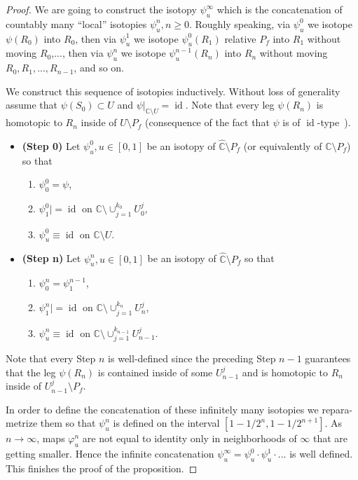 \documentclass[10pt,reqno,a4paper]{amsart}
\numberwithin{figure}{section}
\numberwithin{equation}{section}
\newcommand{\idt}{of $\id$-type}
\newcommand{\id}{\operatorname{id}}
\begin{document}
\begin{proof}
	We are going to construct the isotopy $\psi_u^\infty$ which is the concatenation of countably many ``local'' isotopies $\psi_u^n, n\geq 0$. Roughly speaking, via $\psi_u^0$ we isotope $\psi(R_0)$ into $R_0$, then via $\psi_u^1$ we isotope $\psi_u^0(R_1)$ relative $P_f$ into $R_1$ without moving $R_0$,..., then via $\psi_u^n$ we isotope $\psi_u^{n-1}(R_n)$ into $R_n$ without moving $R_0, R_1,...,R_{n-1}$, and so on. 
	
	We construct this sequence of isotopies inductively. Without loss of generality assume that $\psi(S_0)\subset U$ and $\psi|_{\mathbb{C}\setminus U}=\id$. Note that every leg $\psi(R_n)$ is homotopic to $R_n$ inside of $U\setminus P_f$ (consequence of the fact that $\psi$ is \idt\ ).
	\begin{itemize}
		\item \textbf{(Step 0)} Let $\psi_u^0, u\in[0,1]$ be an isotopy of $\hat{\mathbb{C}}\setminus P_f$ (or equivalently of $\mathbb{C}\setminus P_f$) so that
		\begin{enumerate}
			\item $\psi_0^0=\psi$,
			\item $\psi_1^0|=\id$ on $\mathbb{C}\setminus \cup_{j=1}^{k_0}U_0^j$,
			\item $\psi_u^0\equiv\id$ on $\mathbb{C}\setminus U$.
		\end{enumerate} 
		\item \textbf{(Step n)} Let $\psi_u^n, u\in[0,1]$ be an isotopy of $\hat{\mathbb{C}}\setminus P_f$ so that
		\begin{enumerate}
			\item $\psi_0^n=\psi_1^{n-1}$,
			\item $\psi_1^n|=\id$ on $\mathbb{C}\setminus \cup_{j=1}^{k_n}U_n^j$,
			\item $\psi_u^n\equiv\id$ on $\mathbb{C}\setminus \cup_{j=1}^{k_{n-1}}U_{n-1}^j$.
		\end{enumerate} 
	\end{itemize}	
	Note that every Step $n$ is well-defined since the preceding Step $n-1$ guarantees that the leg $\psi(R_n)$ is contained inside of some $U_{n-1}^j$ and is homotopic to $R_n$ inside of $U_{n-1}^j\setminus P_f$.
	
	In order to define the concatenation of these infinitely many isotopies we repara-metrize them so that $\psi_u^n$ is defined on the interval $[1-1/2^n,1-1/2^{n+1}]$. As $n\to\infty$, maps $\varphi_u^n$ are not equal to identity only in neighborhoods of $\infty$ that are getting smaller. Hence the infinite concatenation $\psi_u^\infty=\psi_u^0\cdot\psi_u^1\cdot...$ is well defined. This finishes the proof of the proposition. 	
\end{proof}
\end{document}
